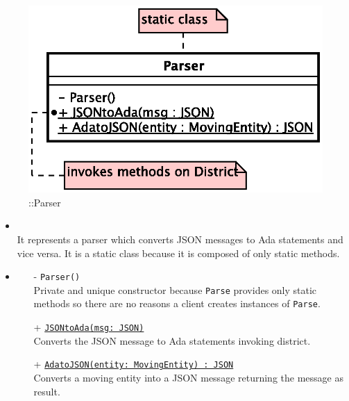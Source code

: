 \begin{figure}[h]
\centering
\includegraphics[scale=0.6,keepaspectratio]{images/solution/app/backend/parser.eps}
\caption{\pInterface::Parser}
\label{fig:sd-app-parser}
\end{figure}
\FloatBarrier
\begin{itemize}
  \item \textbf{\descr} \\
    It represents a parser which converts JSON messages to Ada statements and vice versa.
    It is a static class because it is composed of only static methods.
  \item \textbf{\ops}
  \begin{itemize}
   \item[-] \texttt{Parser()} \\
   Private and unique constructor because \texttt{Parse} provides only static methods 
   so there are no reasons a client creates instances of \texttt{Parse}.
    \item[+] \texttt{\underline{JSONtoAda(msg: JSON)}} \\
    Converts the JSON message to Ada statements invoking district.
    \item[+] \texttt{\underline{AdatoJSON(entity: MovingEntity) : JSON}} \\
    Converts a moving entity into a JSON message returning the message as result.
  \end{itemize}
\end{itemize}
